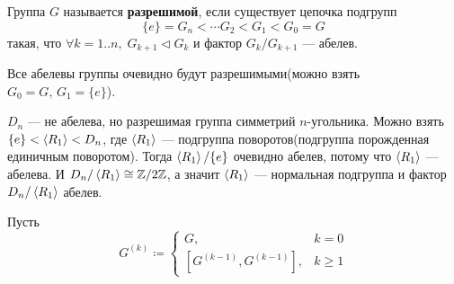 \documentclass[../main.tex]{subfiles}
\begin{document}
\begin{definition}
  Группа $G$ называется \textbf{разрешимой}, если существует цепочка подгрупп
  \begin{equation*}
    \{e\} = G_n < \dotsb G_2 < G_1 < G_0 = G
  \end{equation*}
  такая, что $\forall k =1..n,\; G_{k + 1} \triangleleft G_k$ и фактор $G_k/G_{k + 1}$ --- абелев.
\end{definition}
\begin{remark}
  Все абелевы группы очевидно будут разрешимыми(можно взять $G_0 = G,\, G_1 = \{e\}$).
\end{remark}

\begin{example}
  $D_n$ --- не абелева, но разрешимая группа симметрий $n$-угольника. Можно взять $\{e\} < \left\langle R_1 \right\rangle < D_n$, где $\left\langle R_1 \right\rangle$ --- подгруппа поворотов(подгруппа порожденная единичным поворотом). Тогда $\left\langle R_1 \right\rangle / \{e\}$ очевидно абелев, потому что $\left\langle R_1 \right\rangle$ --- абелева. И $D_n / \left\langle R_1 \right\rangle \cong \mathbb{Z}/2\mathbb{Z}$, а значит $\left\langle R_1 \right\rangle$ --- нормальная подгруппа и фактор $D_n / \left\langle R_1 \right\rangle$ абелев.
\end{example}

Пусть
\begin{equation*}
  G^{(k)} \coloneqq
  \begin{cases}
    G, &k = 0 \\
    [G^{(k - 1)}, G^{(k - 1)}], &k \geq 1
  \end{cases}
\end{equation*}
\end{document}
